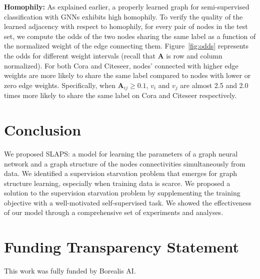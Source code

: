 \documentclass{article}
\def\mA{{\bm{A}}}
\begin{document}
\textbf{Homophily:} 
As explained earlier, a properly learned graph for semi-supervised classification with GNNs exhibits high homophily.
To verify the quality of the learned adjacency with respect to homophily, for every pair of nodes in the test set, we compute the odds of the two nodes sharing the same label as a function of the normalized weight of the edge connecting them. Figure~\ref{fig:odds} represents the odds for different weight intervals (recall that $\mA$ is row and column normalized). For both Cora and Citeseer, nodes' connected with higher edge weights are more likely to share the same label compared to nodes with lower or zero edge weights. Specifically, when $\mA_{ij}\geq 0.1$, $v_i$ and $v_j$ are almost 2.5 and 2.0 times more likely to share the same label on Cora and Citeseer respectively.

\section{Conclusion}
We proposed SLAPS: a model for learning the parameters of a graph neural network and a graph structure of the nodes connectivities simultaneously from data. We identified a supervision starvation problem that emerges for graph structure learning, especially when training data is scarce. We proposed a solution to the supervision starvation problem by supplementing the training objective with a well-motivated self-supervised task. We showed the effectiveness of our model through a comprehensive set of experiments and analyses.

\section{Funding Transparency Statement} 
This work was fully funded by Borealis AI.




\appendix
\end{document}
